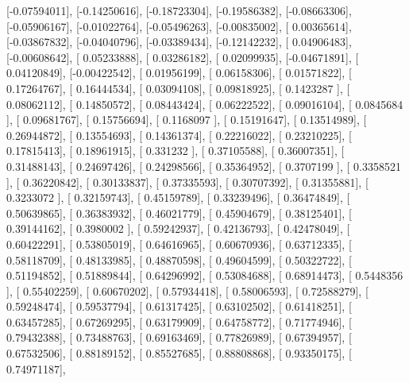 \documentclass{article}
\begin{document}
       [-0.07594011],
       [-0.14250616],
       [-0.18723304],
       [-0.19586382],
       [-0.08663306],
       [-0.05906167],
       [-0.01022764],
       [-0.05496263],
       [-0.00835002],
       [ 0.00365614],
       [-0.03867832],
       [-0.04040796],
       [-0.03389434],
       [-0.12142232],
       [ 0.04906483],
       [-0.00608642],
       [ 0.05233888],
       [ 0.03286182],
       [ 0.02099935],
       [-0.04671891],
       [ 0.04120849],
       [-0.00422542],
       [ 0.01956199],
       [ 0.06158306],
       [ 0.01571822],
       [ 0.17264767],
       [ 0.16444534],
       [ 0.03094108],
       [ 0.09818925],
       [ 0.1423287 ],
       [ 0.08062112],
       [ 0.14850572],
       [ 0.08443424],
       [ 0.06222522],
       [ 0.09016104],
       [ 0.0845684 ],
       [ 0.09681767],
       [ 0.15756694],
       [ 0.1168097 ],
       [ 0.15191647],
       [ 0.13514989],
       [ 0.26944872],
       [ 0.13554693],
       [ 0.14361374],
       [ 0.22216022],
       [ 0.23210225],
       [ 0.17815413],
       [ 0.18961915],
       [ 0.331232  ],
       [ 0.37105588],
       [ 0.36007351],
       [ 0.31488143],
       [ 0.24697426],
       [ 0.24298566],
       [ 0.35364952],
       [ 0.3707199 ],
       [ 0.3358521 ],
       [ 0.36220842],
       [ 0.30133837],
       [ 0.37335593],
       [ 0.30707392],
       [ 0.31355881],
       [ 0.3233072 ],
       [ 0.32159743],
       [ 0.45159789],
       [ 0.33239496],
       [ 0.36474849],
       [ 0.50639865],
       [ 0.36383932],
       [ 0.46021779],
       [ 0.45904679],
       [ 0.38125401],
       [ 0.39144162],
       [ 0.3980002 ],
       [ 0.59242937],
       [ 0.42136793],
       [ 0.42478049],
       [ 0.60422291],
       [ 0.53805019],
       [ 0.64616965],
       [ 0.60670936],
       [ 0.63712335],
       [ 0.58118709],
       [ 0.48133985],
       [ 0.48870598],
       [ 0.49604599],
       [ 0.50322722],
       [ 0.51194852],
       [ 0.51889844],
       [ 0.64296992],
       [ 0.53084688],
       [ 0.68914473],
       [ 0.5448356 ],
       [ 0.55402259],
       [ 0.60670202],
       [ 0.57934418],
       [ 0.58006593],
       [ 0.72588279],
       [ 0.59248474],
       [ 0.59537794],
       [ 0.61317425],
       [ 0.63102502],
       [ 0.61418251],
       [ 0.63457285],
       [ 0.67269295],
       [ 0.63179909],
       [ 0.64758772],
       [ 0.71774946],
       [ 0.79432388],
       [ 0.73488763],
       [ 0.69163469],
       [ 0.77826989],
       [ 0.67394957],
       [ 0.67532506],
       [ 0.88189152],
       [ 0.85527685],
       [ 0.88808868],
       [ 0.93350175],
       [ 0.74971187],
\end{document}
